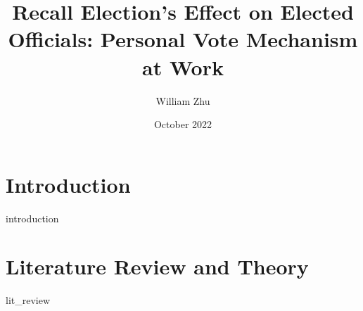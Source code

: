 \documentclass{article}
\title{Recall Election's Effect on Elected Officials: Personal Vote Mechanism at Work}
\author{William Zhu}
\date{October 2022}
\begin{document}
\maketitle

\section*{Introduction}

{introduction}

\newpage

\section*{Literature Review and Theory}
{lit_review}

\newpage
%
%
%
%
%
%
%
%
%
%
%
%
%
%

\newpage
\end{document}

